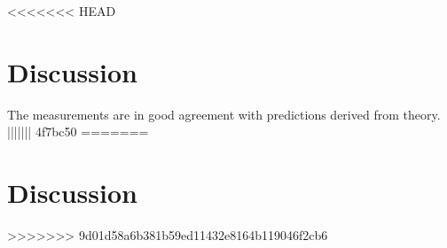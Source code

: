<<<<<<< HEAD
\section{Discussion}
\label{sec:discussion}

The measurements are in good agreement with predictions derived from theory.
||||||| 4f7bc50
=======
\section{Discussion}

>>>>>>> 9d01d58a6b381b59ed11432e8164b119046f2cb6
